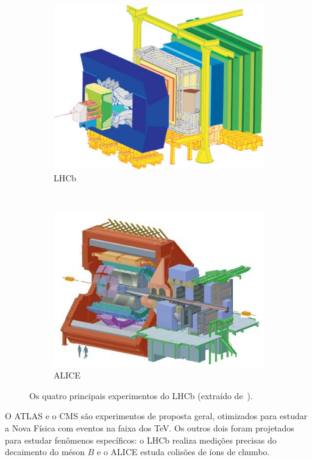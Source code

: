 \begin{figure}[h!]
\begin{subfigure}[b]{0.45\textwidth}
        \includegraphics[width=\textwidth]{images/lhcb.jpg}
        \caption{LHCb}
    \end{subfigure}
    ~
    \begin{subfigure}[b]{0.45\textwidth}
        \centering
        \includegraphics[width=\textwidth]{images/alice.jpg}
        \caption{ ALICE}
    \end{subfigure}
    \caption[Os quatro principais experimentos do LHCb]{Os quatro principais
    experimentos do LHCb (extraído de~\cite{ref:solans}).}
    \label{fig:experiments}
\end{figure}

O ATLAS e o CMS são experimentos de proposta geral, otimizados para estudar a
Nova Física com eventos na faixa dos TeV. Os outros dois foram projetados para
estudar fenômenos específicos: o LHCb realiza medições precisas do decaimento
do méson $B$ e o ALICE estuda colisões de íons de chumbo.


